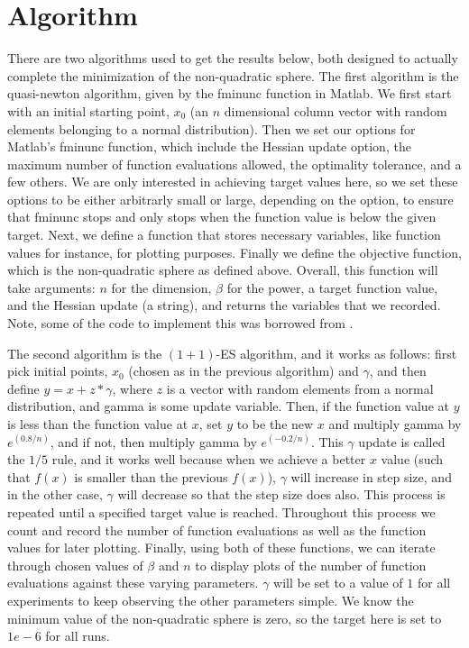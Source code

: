 \documentclass[sigconf, 7pt]{acmart}
\begin{document}
\section{Algorithm}
\label{algorithm}
There are two algorithms used to get the results below, both designed to actually complete the minimization of the non-quadratic sphere. The first algorithm is the quasi-newton algorithm, given by the fminunc function in Matlab. We first start with an initial starting point, $x_0$ (an $n$ dimensional column vector with random elements belonging to a normal distribution). Then we set our options for Matlab's fminunc function, which include the Hessian update option, the maximum number of function evaluations allowed, the optimality tolerance, and a few others. We are only interested in achieving target values here, so we set these options to be either arbitrarly small or large, depending on the option, to ensure that fminunc stops and only stops when the function value is below the given target. Next, we define a function that stores necessary variables, like function values for instance, for plotting purposes. Finally we define the objective function, which is the non-quadratic sphere as defined above. Overall, this function will take arguments: $n$ for the dimension, $\beta$ for the power, a target function value, and the Hessian update (a string), and returns the variables that we recorded. Note, some of the code to implement this was borrowed from \cite{MathWorks}.

The second algorithm is the $(1+1)$-ES algorithm, and it works as follows: first pick initial points, $x_0$ (chosen as in the previous algorithm) and $\gamma$, and then define $y = x + z*\gamma$, where $z$ is a vector with random elements from a normal distribution, and gamma is some update variable. Then, if the function value at $y$ is less than the function value at $x$, set $y$ to be the new $x$ and multiply gamma by $e^{(0.8/n)}$, and if not, then multiply gamma by $e^{(-0.2/n)}$. This $\gamma$ update is called the $1/5$ rule, and it works well because when we achieve a better $x$ value (such that $f(x)$ is smaller than the previous $f(x)$), $\gamma$ will increase in step size, and in the other case, $\gamma$ will decrease so that the step size does also.  This process is repeated until a specified target value is reached. Throughout this process we count and record the number of function evaluations as well as the function values for later plotting. Finally, using both of these functions, we can iterate through chosen values of $\beta$ and $n$ to display plots of the number of function evaluations against these varying parameters. $\gamma$ will be set to a value of $1$ for all experiments to keep observing the other parameters simple. We know the minimum value of the non-quadratic sphere is zero, so the target here is set to $1e-6$ for all runs.
\end{document}
